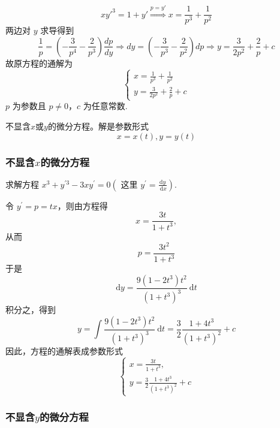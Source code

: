 \begin{solution}
    $$
        xy'^{3}=1+y'\overset{ p=y' }{ \Rightarrow } x=\frac{1}{p^{3}}+\frac{1}{p^{2}}
    $$
    两边对 $y$ 求导得到
    $$
        \frac{1}{p}=\left( -\frac{3}{p^{4}} -\frac{2}{p^{3}}  \right)\frac{dp}{dy}\Rightarrow dy=\left( -\frac{3}{p^{3}} -\frac{2}{p^{2}}  \right)dp\Rightarrow y=\frac{3}{2p^{2}}+\frac{2}{p}+c
    $$
    故原方程的通解为
    $$
        \left\{\begin{array}{l}
            x=\frac{1}{p^{3}}+\frac{1}{p^{2}} \\
            y=\frac{3}{2p^{2}} +\frac{2}{p}+c
        \end{array}\right.
    $$
    $p$ 为参数且 $\displaystyle p\neq0$，$c$ 为任意常数.
\end{solution}

\begin{note}
    不显含$x$或$y$的微分方程。解是参数形式
    \[
        x=x(t),y=y(t)
    \]
\end{note}
\subsubsection{不显含$x$的微分方程}

\begin{example}
    求解方程 $x^3+y^{\prime 3}-3 x y^{\prime}=0\left(\right.$ 这里 $\left.y^{\prime}=\frac{\mathrm{d} y}{\mathrm{~d} x}\right)$.
\end{example}

\begin{solution}
    令 $y^{\prime}=p=t x$，则由方程得
    $$
        x=\frac{3 t}{1+t^3},
    $$
    从而
    $$
        p=\frac{3 t^2}{1+t^3}
    $$
    于是
    $$
        \mathrm{d} y=\frac{9\left(1-2 t^3\right) t^2}{\left(1+t^3\right)^3} \mathrm{~d} t
    $$
    积分之，得到
    $$
        y=\int \frac{9\left(1-2 t^3\right) t^2}{\left(1+t^3\right)^3} \mathrm{~d} t=\frac{3}{2} \frac{1+4 t^3}{\left(1+t^3\right)^2}+c
    $$
    因此，方程的通解表成参数形式
    $$
        \left\{\begin{array}{l}
            x=\frac{3 t}{1+t^3}, \\
            y=\frac{3}{2} \frac{1+4 t^3}{\left(1+t^3\right)^2}+c
        \end{array}\right.
    $$
\end{solution}

\subsubsection{不显含$y$的微分方程}

